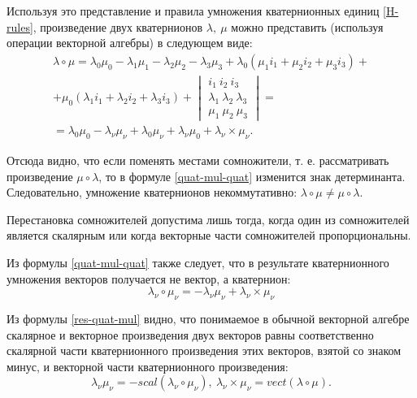 \documentclass[14pt]{extreport}
\begin{document}
Используя это представление и правила умножения кватернионных единиц \eqref{H-rules}, произведение двух кватернионов $\lambda,\ \mu$ можно представить (используя операции векторной алгебры) в следующем виде:
\begin{equation}
\label{quat-mul-quat}
\begin{split}
\lambda \circ \mu = \lambda_{0}\mu_{0}-\lambda_{1}\mu_{1}-\lambda_{2}\mu_{2}-\lambda_{3}\mu_{3}+\lambda_{0}(\mu_{1}i_{1}+\mu_{2}i_{2}+\mu_{3}i_{3})+\\
+\mu_{0}(\lambda_{1}i_{1}+\lambda_{2}i_{2}+\lambda_{3}i_{3})+
\begin{vmatrix}
  i_{1}\ i_{2}\ i_{3}\\
  \lambda_{1}\ \lambda_{2}\ \lambda_{3}\\
  \mu_{1}\ \mu_{2}\ \mu_{3}
\end{vmatrix} =\\
= \lambda_{0}\mu_{0}-\lambda_{\nu}\mu_{\nu}+\lambda_{0}\mu_{\nu}+\lambda_{\nu}\mu_{0}+\lambda_{\nu}\times \mu_{\nu}.
\end{split}
\end{equation}

Отсюда видно, что если поменять местами сомножители, т. е. рассматривать произведение $\mu \circ \lambda$, то в формуле \eqref{quat-mul-quat} изменится знак детерминанта. Следовательно, умножение кватернионов некоммутативно: $\lambda \circ \mu \neq \mu \circ \lambda$.

Перестановка сомножителей допустима лишь тогда, когда один из сомножителей является скалярным или когда векторные части сомножителей пропорциональны.

Из формулы \eqref{quat-mul-quat} также следует, что в результате кватернионного умножения векторов получается не вектор, а кватернион:
\begin{equation}
\label{res-quat-mul}
\lambda_{\nu} \circ \mu_{\nu} = -\lambda_{\nu} \mu_{\nu} + \lambda_{\nu} \times \mu_{\nu}
\end{equation}

Из формулы \eqref{res-quat-mul} видно, что понимаемое в обычной векторной алгебре скалярное и векторное произведения двух векторов равны соответственно скалярной части кватернионного произведения этих векторов, взятой со знаком минус, и векторной части кватернионного произведения:
\begin{equation}
\lambda_{\nu}\mu_{\nu} = -scal(\lambda_{\nu} \circ \mu_{\nu}),\ \lambda_{\nu} \times \mu_{\nu} = vect(\lambda \circ \mu).
\end{equation}
\end{document}
